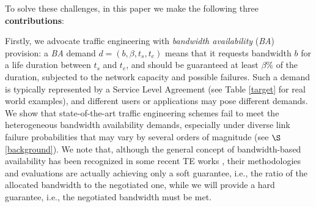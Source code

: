 \documentclass[sigconf]{acmart}
\begin{document}


To solve these challenges, in this paper we make the following  three \textbf{contributions}:



Firstly, we advocate traffic engineering with \textit{bandwidth availability} (\textit{BA}) provision: 
a \textit{BA} demand $d=(b, \beta, t_s, t_e)$ means that it requests bandwidth $b$ for a life duration between $t_s$ and $t_e$, and should be guaranteed at least $\beta\%$ of the duration, subjected to the network capacity and possible failures. Such a demand is typically represented by a Service Level Agreement (see Table \ref{target} for real world examples), and different users or applications may pose different demands. 
We show that state-of-the-art traffic engineering schemes fail to meet the heterogeneous bandwidth  availability demands, especially under diverse link failure probabilities that may vary by several orders of magnitude (see $\S$\ref{background}). We note that, although the general concept of bandwidth-based availability has been recognized in some recent TE works \cite{hong2018b4,bwe, B4}, their methodologies and evaluations are actually achieving only a soft guarantee, i.e., the ratio of the allocated bandwidth to the negotiated one, while we will provide a hard guarantee, i.e., the negotiated bandwidth must be met.
\end{document}
